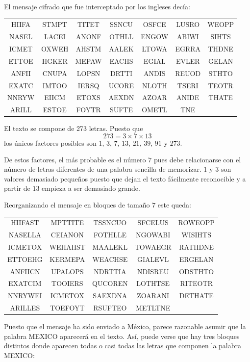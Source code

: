 \documentclass[nochap]{apuntesURJC}
\begin{document}
El mensaje cifrado que fue interceptado por los ingleses decía:
\begin{center}
\begin{tabular}{ccccccc}
HIIFA & STMPT & TITET & SSNCU & OSFCE & LUSRO & WEOPP\\
NASEL & LACEI & ANONF & OTHLL & ENGOW & ABIWI & SIHTS\\
ICMET & OXWEH & AHSTM & AALEK & LTOWA & EGRRA & THDNE\\
ETTOE & HGKER & MEPAW & EACHS & EGIAL & EVLER & GELAN\\
ANFII & CNUPA & LOPSN & DRTTI & ANDIS & REUOD & STHTO\\
EXATC & IMTOO & IERSQ & UCORE & NLOTH & TSERI & TEOTR\\
NNRYW & EIICM & ETOXS & AEXDN & AZOAR & ANIDE & THATE\\
ARILL & ESTOE & FOYTR & SUFTE & OMETL & TNE &
\end{tabular}
\end{center}

El texto se compone de 273 letras. Puesto que
\[273 = 3 \times 7 \times 13\]
los únicos factores posibles son $1$, $3$, $7$, $13$, $21$, $39$, $91$ y $273$.

De estos factores, el más probable es el número $7$ pues debe relacionarse con el número de letras diferentes de una palabra sencilla de memorizar. $1$ y $3$ son valores demasiado pequeños puesto que dejan el texto fácilmente reconocible y a partir de $13$ empieza a ser demasiado grande.

Reorganizando el mensaje en bloques de tamaño $7$ este queda:
\begin{center}
\begin{tabular}{ccccc}
HIIFAST & MPTTITE & TSSNCUO & SFCELUS & ROWEOPP\\
NASELLA & CEIANON & FOTHLLE & NGOWABI & WISIHTS\\
ICMETOX & WEHAHST & MAALEKL & TOWAEGR & RATHDNE\\
ETTOEHG & KERMEPA & WEACHSE & GIALEVL & ERGELAN\\
ANFIICN & UPALOPS & NDRTTIA & NDISREU & ODSTHTO\\
EXATCIM & TOOIERS & QUCOREN & LOTHTSE & RITEOTR\\
NNRYWEI & ICMETOX & SAEXDNA & ZOARANI & DETHATE\\
ARILLES & TOEFOYT & RSUFTEO & METLTNE &
\end{tabular}
\end{center}

Puesto que el mensaje ha sido enviado a México, parece razonable asumir que la palabra MEXICO aparecerá en el texto. Así, puede verse que hay tres bloques distintos donde aparecen todas o casi todas las letras que componen la palabra MEXICO:
\end{document}
